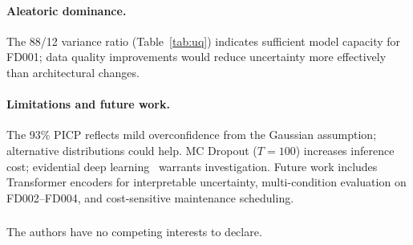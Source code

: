 \documentclass[runningheads]{llncs}
\begin{document}
\paragraph{Aleatoric dominance.}
The 88/12 variance ratio (Table~\ref{tab:uq}) indicates sufficient model capacity for FD001; data quality improvements would reduce uncertainty more effectively than architectural changes.

\paragraph{Limitations and future work.}
The 93\% PICP reflects mild overconfidence from the Gaussian assumption; alternative distributions could help.
MC Dropout ($T{=}100$) increases inference cost; evidential deep learning~\cite{amini2020deep} warrants investigation.
Future work includes Transformer encoders for interpretable uncertainty, multi-condition evaluation on FD002--FD004, and cost-sensitive maintenance scheduling.

\begin{credits}
\subsubsection{\discintname}
The authors have no competing interests to declare.
\end{credits}
\end{document}
